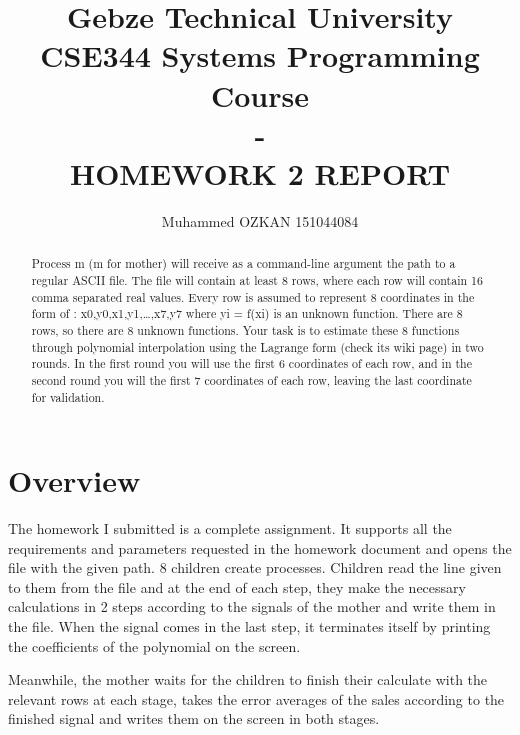 \documentclass{article}
\begin{document}
\title{Gebze Technical University\\CSE344 Systems Programming Course\\ -\\HOMEWORK 2 REPORT}
\author{Muhammed OZKAN 151044084}

\maketitle

\begin{abstract}
Process m (m for mother) will receive as a command-line argument the path to a regular ASCII file.
The file will contain at least 8 rows, where each row will contain 16 comma separated real values.
Every row is assumed to represent 8 coordinates in the form of : x0,y0,x1,y1,…,x7,y7
where yi = f(xi) is an unknown function. There are 8 rows, so there are 8 unknown
functions. Your task is to estimate these 8 functions through polynomial interpolation using the
Lagrange form (check its wiki page) in two rounds. In the first round you will use the first 6
coordinates of each row, and in the second round you will the first 7 coordinates of each row,
leaving the last coordinate for validation.

\end{abstract}

\section{Overview}
\quad The homework I submitted is a complete assignment. It supports all the requirements and parameters requested in the homework document and opens the file with the given path. 8 children create processes. Children read the line given to them from the file and at the end of each step, they make the necessary calculations in 2 steps according to the signals of the mother and write them in the file. When the signal comes in the last step, it terminates itself by printing the coefficients of the polynomial on the screen.
\par Meanwhile, the mother waits for the children to finish their calculate with the relevant rows at each stage, takes the error averages of the sales according to the finished signal and writes them on the screen in both stages.\\
\newpage
\end{document}
